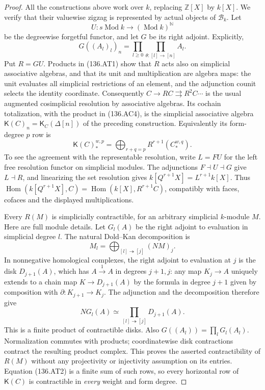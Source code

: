 \begin{proof}
All the constructions above work over $k$, replacing
$\mathbb Z[X]$ by $k[X]$. We verify that their valuewise
zigzag is represented by actual objects of $\mathcal B_k$.
Let
\[
 U:s\operatorname{Mod}k\longrightarrow
                  (\operatorname{Mod}k)^{\mathbb N}
\]
be the degreewise forgetful functor, and let $G$ be its
right adjoint. Explicitly,
\[
 G((A_l)_l)_n=
       \prod_{l\geq0}\prod_{\theta:[l]\to[n]} A_l.
                                                               \tag{136.AT1}
\]
Put $R=GU$. Products in (136.AT1) show that $R$ acts
also on simplicial associative algebras, and that its
unit and multiplication are algebra maps: the unit
evaluates all simplicial restrictions of an element,
and the adjunction counit selects the identity coordinate.
Consequently $C\to RC\rightrightarrows R^2C\cdots$ is
the usual augmented cosimplicial resolution by associative
algebras. Its cochain totalization, with the product in
(136.AC4), is the simplicial associative algebra
$\mathsf K(C)_n=\mathsf K_C(\Delta[n])$ of the preceding
construction. Equivalently its form-degree $p$ row is
\[
          \mathsf K(C)^{w,p}_*
          =\bigoplus_{r+q=p}R^{r+1}(C^{w,q}_*).
                                                               \tag{136.AT2}
\]
To see the agreement with the representable resolution,
write $L=FU$ for the left free resolution functor on
simplicial modules. The adjunctions $F\dashv U\dashv G$
give $L\dashv R$, and linearizing the set resolution
gives $k[Q^{r+1}X]=L^{r+1}k[X]$. Thus
$\operatorname{Hom}(k[Q^{r+1}X],C)=
\operatorname{Hom}(k[X],R^{r+1}C)$, compatibly with
faces, cofaces and the displayed multiplications.

Every $R(M)$ is simplicially contractible, for an
arbitrary simplicial $k$-module $M$. Here are full
module details. Let $G_l(A)$ be the right adjoint
to evaluation in simplicial degree $l$. The natural
Dold--Kan decomposition is
\[
 M_l=\bigoplus_{[l]\twoheadrightarrow[j]}(NM)_j.
\]
In nonnegative homological complexes, the right adjoint
to evaluation at $j$ is the disk $D_{j+1}(A)$, which
has $A\xrightarrow{1}A$ in degrees $j+1,j$:
any map $K_j\to A$ uniquely extends to a chain map
$K\to D_{j+1}(A)$ by the formula in degree $j+1$
given by composition with $\partial:K_{j+1}\to K_j$.
The adjunction and the decomposition therefore give
\[
              NG_l(A)\simeq
                 \prod_{[l]\twoheadrightarrow[j]}
                                      D_{j+1}(A).       \tag{136.AT3}
\]
This is a finite product of contractible disks.
Also $G((A_l))=\prod_l G_l(A_l)$. Normalization
commutes with products; coordinatewise disk contractions
contract the resulting product complex. This proves
the asserted contractibility of $R(M)$ without any
projectivity or injectivity assumption on its entries.
Equation (136.AT2) is a finite sum of such rows, so
every horizontal row of $\mathsf K(C)$ is contractible
in \emph{every} weight and form degree.


\end{proof}
